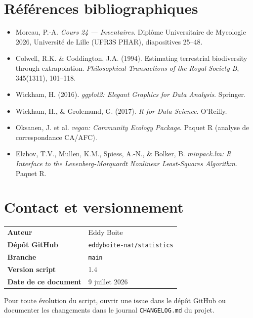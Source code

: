\documentclass[11pt,a4paper]{article}
\begin{document}
\section{Références bibliographiques}
\begin{itemize}[leftmargin=1.2cm]
  \item Moreau, P.-A. \textit{Cours 24 --- Inventaires}. Diplôme Universitaire de Mycologie 2026, Université de Lille (UFR3S PHAR), diapositives 25--48.
  \item Colwell, R.K. \& Coddington, J.A. (1994). Estimating terrestrial biodiversity through extrapolation. \textit{Philosophical Transactions of the Royal Society B}, 345(1311), 101--118.
  \item Wickham, H. (2016). \textit{ggplot2: Elegant Graphics for Data Analysis}. Springer.
  \item Wickham, H., \& Grolemund, G. (2017). \textit{R for Data Science}. O'Reilly.
  \item Oksanen, J. et al. \textit{vegan: Community Ecology Package}. Paquet R (analyse de correspondance CA/AFC).
  \item Elzhov, T.V., Mullen, K.M., Spiess, A.-N., \& Bolker, B. \textit{minpack.lm: R Interface to the Levenberg-Marquardt Nonlinear Least-Squares Algorithm}. Paquet R.
\end{itemize}

\section*{Contact et versionnement}

\begin{table}[htbp]
  \centering
  \begin{tabular}{ll}
    \toprule
    \textbf{Auteur}          & Eddy Boite \\
    \textbf{Dépôt GitHub}    & \texttt{eddyboite-nat/statistics} \\
    \textbf{Branche}         & \texttt{main} \\
    \textbf{Version script}  & 1.4 \\
    \textbf{Date de ce document} & 9 juillet 2026 \\
    \bottomrule
  \end{tabular}
\end{table}

Pour toute évolution du script, ouvrir une issue dans le dépôt GitHub
ou documenter les changements dans le journal \texttt{CHANGELOG.md} du projet.

\end{document}

